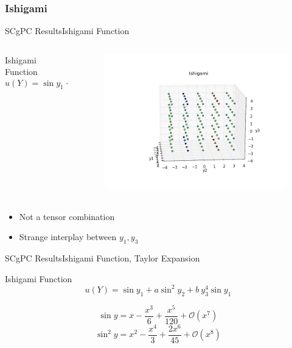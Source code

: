 \documentclass{beamer}
\begin{document}
\subsubsection{Ishigami}
\begin{frame}{SCgPC Results}{Ishigami Function}\vspace{-20pt}
  \begin{columns}
    \begin{column}{0.6\textwidth}
      \begin{block}{Ishigami Function}
        \[u(Y) = \sin{y_1} + a\sin^2{y_2} + b\ y_3^4\sin{y_1}\]
      \end{block}
    \end{column}
    \begin{column}{0.4\textwidth}
        \begin{figure}[h!]
          \centering
          \includegraphics[width=\linewidth]{anlmodels/ishigami}
        \end{figure}
    \end{column}
  \end{columns}
  \begin{itemize}
    \item Not a tensor combination
    \item Strange interplay between $y_1,y_3$
  \end{itemize}
\end{frame}
\begin{frame}{SCgPC Results}{Ishigami Function, Taylor Expansion}\vspace{-20pt}
      \begin{block}{Ishigami Function}
        \[u(Y) = \sin{y_1} + a\sin^2{y_2} + b\ y_3^4\sin{y_1}\]
      \end{block}
\vfill
\begin{equation*}
  \sin{y} = x - \frac{x^3}{6} + \frac{x^5}{120} + \mathcal{O}(x^7)
\end{equation*}
\vfill
\begin{equation*}
  \sin^2{y} = x^2 - \frac{x^4}{3} + \frac{2x^6}{45} + \mathcal{O}(x^8)
\end{equation*}
\vfill
\end{frame}
\end{document}
